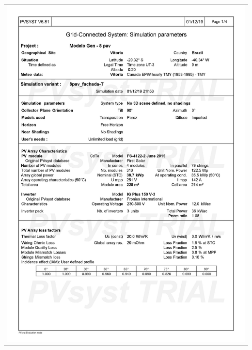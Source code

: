 \begin{table}[H]
    \centering
    \begin{tabular}{l}
        \includegraphics[width=\textwidth]{figures/attachments/resultpv11.jpg}
    \end{tabular}
\end{table}
\pagebreak
